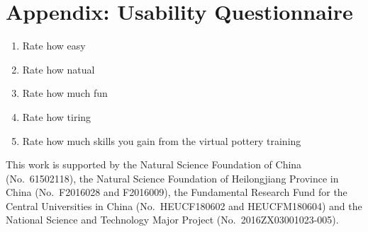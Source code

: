 \documentclass{svjour3}                     %
\begin{document}
\section*{Appendix: Usability Questionnaire}

\begin{enumerate}
\item Rate how easy
\item Rate how natual
\item Rate how much fun
\item Rate how tiring
\item Rate how much skills you gain from the virtual pottery training
\end{enumerate}


\begin{acknowledgements}
This work is supported by the Natural Science Foundation of China (No.~61502118), the Natural Science Foundation of Heilongjiang Province in China (No.~F2016028 and F2016009), the Fundamental Research Fund for the Central Universities in China (No.~HEUCF180602 and HEUCFM180604) and the National Science and Technology Major Project (No.~2016ZX03001023-005).
\end{acknowledgements}


%
%
\end{document}
